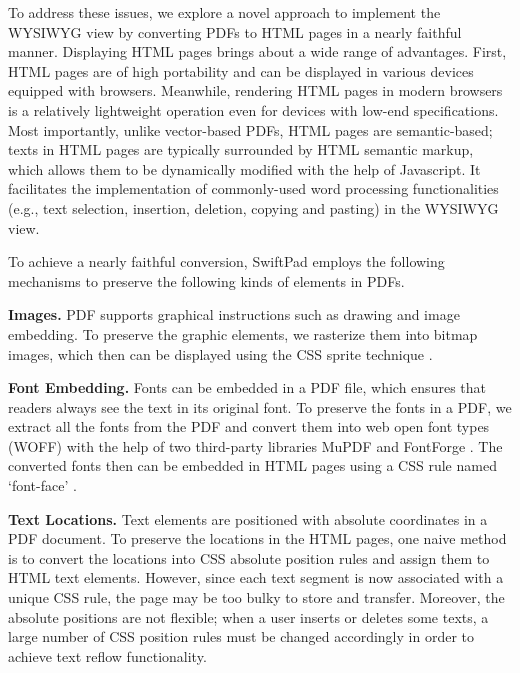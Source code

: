 \documentclass[]{sigchi}
\begin{document}
To address these issues, we explore a novel approach to implement the WYSIWYG view by converting PDFs to HTML pages in a nearly faithful manner. Displaying HTML pages brings about a wide range of advantages. First, HTML pages are of high portability and can be displayed in various devices equipped with browsers. Meanwhile, rendering HTML pages in modern browsers is a relatively lightweight operation even for devices with low-end specifications. Most importantly, unlike vector-based PDFs, HTML pages are semantic-based; texts in HTML pages are typically surrounded by HTML semantic markup, which allows them to be dynamically modified with the help of Javascript. It facilitates the implementation of commonly-used word processing functionalities (e.g., text selection, insertion, deletion, copying and pasting) in the WYSIWYG view.


To achieve a nearly faithful conversion, SwiftPad employs the following mechanisms to preserve the following kinds of elements in PDFs. 

\textbf{Images.} PDF supports graphical instructions such as drawing and image embedding. To preserve the graphic elements, we rasterize them into bitmap images, which then can be displayed using the CSS sprite technique \cite{souders2008high}.

\textbf{Font Embedding.} Fonts can be embedded in a PDF file, which ensures that readers always see the text in its original font. To preserve the fonts in a PDF, we extract all the fonts from the PDF and convert them into web open font types (WOFF) with the help of two third-party libraries MuPDF \cite{mupdf} and FontForge \cite{williams2003font}. The converted fonts then can be embedded in HTML pages using a CSS rule named `font-face' \cite{souders2008high}. 


\textbf{Text Locations.} Text elements are positioned with absolute coordinates in a PDF document. To preserve the locations in the HTML pages, one naive method is to convert the locations into CSS absolute position rules and assign them to HTML text elements. However, since each text segment is now associated with a unique CSS rule, the	page may be too bulky to store and transfer. Moreover, the absolute positions are not flexible; when a user inserts or deletes some texts, 
a large number  of CSS position rules must be changed accordingly in order to achieve text reflow functionality.	
\end{document}

